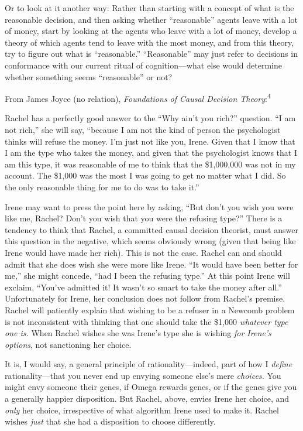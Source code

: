 {
 Or to look at it another way: Rather than starting with a concept
of what is the reasonable decision, and then asking whether
``reasonable'' agents leave with a
lot of money, start by looking at the agents who leave with a lot of
money, develop a theory of which agents tend to leave with the most
money, and from this theory, try to figure out what is
``reasonable.''
``Reasonable'' may just refer to
decisions in conformance with our current ritual of cognition---what
else would determine whether something seems
``reasonable'' or not?}

{
 From James Joyce (no relation), \textit{Foundations of Causal
Decision Theory}:\textsuperscript{4}}

{
 Rachel has a perfectly good answer to the ``Why
ain't you rich?'' question.
``I am not rich,'' she will say,
``because I am not the kind of person the psychologist
thinks will refuse the money. I'm just not like you,
Irene. Given that I know that I am the type who takes the money, and
given that the psychologist knows that I am this type, it was
reasonable of me to think that the \$1,000,000 was not in my account.
The \$1,000 was the most I was going to get no matter what I did. So
the only reasonable thing for me to do was to take
it.''}

{
 Irene may want to press the point here by asking,
``But don't you wish you were like me,
Rachel? Don't you wish that you were the refusing
type?'' There is a tendency to think that Rachel, a
committed causal decision theorist, must answer this question in the
negative, which seems obviously wrong (given that being like Irene
would have made her rich). This is not the case. Rachel can and should
admit that she does wish she were more like Irene.
``It would have been better for
me,'' she might concede, ``had I
been the refusing type.'' At this point Irene will
exclaim, ``You've admitted it! It
wasn't so smart to take the money after
all.'' Unfortunately for Irene, her conclusion does
not follow from Rachel's premise. Rachel will patiently
explain that wishing to be a refuser in a Newcomb problem is not
inconsistent with thinking that one should take the \$1,000
\textit{whatever type one is.} When Rachel wishes she was
Irene's type she is wishing \textit{for
Irene's options}, not sanctioning her choice.}

{
 It is, I would say, a general principle of rationality---indeed,
part of how I \textit{define} rationality---that you never end up
envying someone else's mere \textit{choices.} You might
envy someone their genes, if Omega rewards genes, or if the genes give
you a generally happier disposition. But Rachel, above, envies Irene
her choice, and \textit{only} her choice, irrespective of what
algorithm Irene used to make it. Rachel wishes \textit{just} that she
had a disposition to choose differently.}

